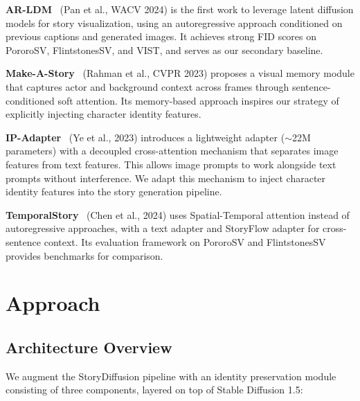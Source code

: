 \documentclass[11pt]{article}
\begin{document}
\textbf{AR-LDM}~\cite{pan2024arldm} (Pan et al., WACV 2024) is the first work to leverage latent diffusion models for story visualization, using an autoregressive approach conditioned on previous captions and generated images. It achieves strong FID scores on PororoSV, FlintstonesSV, and VIST, and serves as our secondary baseline.

\textbf{Make-A-Story}~\cite{rahman2023makeastory} (Rahman et al., CVPR 2023) proposes a visual memory module that captures actor and background context across frames through sentence-conditioned soft attention. Its memory-based approach inspires our strategy of explicitly injecting character identity features.

\textbf{IP-Adapter}~\cite{ye2023ipadapter} (Ye et al., 2023) introduces a lightweight adapter ($\sim$22M parameters) with a decoupled cross-attention mechanism that separates image features from text features. This allows image prompts to work alongside text prompts without interference. We adapt this mechanism to inject character identity features into the story generation pipeline.

\textbf{TemporalStory}~\cite{chen2024temporalstory} (Chen et al., 2024) uses Spatial-Temporal attention instead of autoregressive approaches, with a text adapter and StoryFlow adapter for cross-sentence context. Its evaluation framework on PororoSV and FlintstonesSV provides benchmarks for comparison.

\section{Approach}

\subsection{Architecture Overview}

We augment the StoryDiffusion pipeline with an identity preservation module consisting of three components, layered on top of Stable Diffusion 1.5:
\end{document}
